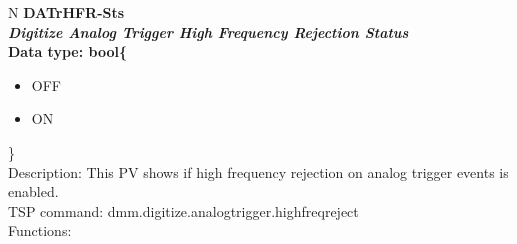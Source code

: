 \documentclass[openany]{article}
\begin{document}
		\begin{tabular}{N}
			\hline
			\bfseries DATrHFR-Sts\label{pv:datrhfr-sts} \\ \hline
			\emph{Digitize Analog Trigger High Frequency Rejection Status} \\
			Data type: bool\{\begin{itemize}[noitemsep]
				\small
				\item[] OFF
				\item[] ON
			\end{itemize}\} \\
			Description: This PV shows if high frequency rejection on analog trigger events is enabled. \\
			TSP command: dmm.digitize.analogtrigger.highfreqreject \\
			Functions: \\
			\arrayrulecolor{\FuncTableBorderColor}

		\end{tabular}
\end{document}
